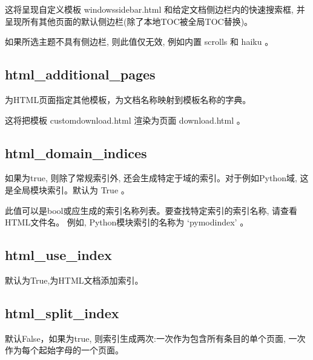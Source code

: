\documentclass[a4paper,10pt,english]{sphinxmanual}
\begin{document}
\sphinxAtStartPar
这将呈现自定义模板 windowssidebar.html 和给定文档侧边栏内的快速搜索框, 并呈现所有其他页面的默认侧边栏(除了本地TOC被全局TOC替换)。

\begin{DUlineblock}{0em}
\item[] 如果所选主题不具有侧边栏, 则此值仅无效, 例如内置 scrolls 和 haiku 。
\end{DUlineblock}


\subsection{html\_additional\_pages}
\label{\detokenize{sphinx_conf:html-additional-pages}}
\sphinxAtStartPar
为HTML页面指定其他模板，为文档名称映射到模板名称的字典。

\begin{sphinxVerbatim}[commandchars=\\\{\}]
  
   
\end{sphinxVerbatim}

\sphinxAtStartPar
这将把模板 customdownload.html 渲染为页面 download.html 。


\subsection{html\_domain\_indices}
\label{\detokenize{sphinx_conf:html-domain-indices}}
\sphinxAtStartPar
如果为true, 则除了常规索引外, 还会生成特定于域的索引。对于例如Python域, 这是全局模块索引。默认为 True 。

\sphinxAtStartPar
此值可以是bool或应生成的索引名称列表。要查找特定索引的索引名称, 请查看HTML文件名。
例如, Python模块索引的名称为 ‘py\sphinxhyphen{}modindex’ 。


\subsection{html\_use\_index}
\label{\detokenize{sphinx_conf:html-use-index}}
\sphinxAtStartPar
默认为True,为HTML文档添加索引。


\subsection{html\_split\_index}
\label{\detokenize{sphinx_conf:html-split-index}}
\sphinxAtStartPar
默认False，如果为true, 则索引生成两次:一次作为包含所有条目的单个页面, 一次作为每个起始字母的一个页面。
\end{document}
